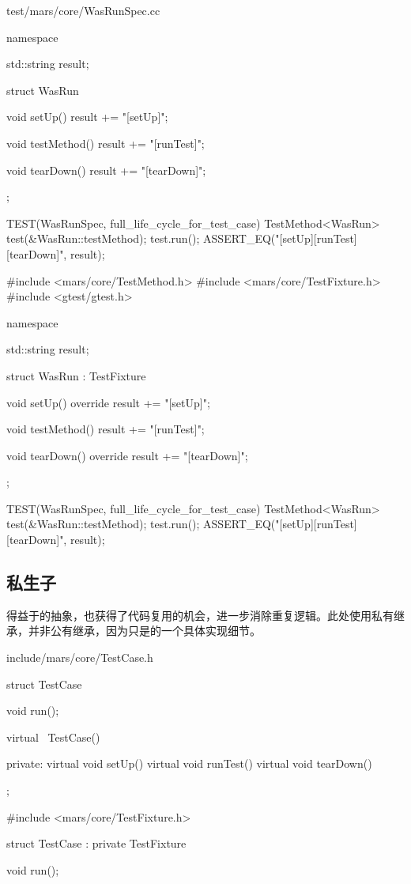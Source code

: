 \begin{content}
\begin{diff}{test/mars/core/WasRunSpec.cc}
\begin{minicpp}
namespace {
  std::string result;

  struct WasRun {
    void setUp() {
      result += "[setUp]";
    }

    void testMethod() {
      result += "[runTest]";
    }

    void tearDown() {
      result += "[tearDown]";
    }
  };
}

TEST(WasRunSpec, full_life_cycle_for_test_case) {
  TestMethod<WasRun> test(&WasRun::testMethod);
  test.run();
  ASSERT_EQ("[setUp][runTest][tearDown]", result);
}
\end{minicpp}
\tcblower
\begin{minicpp}
#include <mars/core/TestMethod.h>
#include <mars/core/TestFixture.h>
#include <gtest/gtest.h>

namespace {
  std::string result;

  struct WasRun : TestFixture {
    void setUp() override {
      result += "[setUp]";
    }

    void testMethod() {
      result += "[runTest]";
    }

    void tearDown() override {
      result += "[tearDown]";
    }
  };
}

TEST(WasRunSpec, full_life_cycle_for_test_case) {
  TestMethod<WasRun> test(&WasRun::testMethod);
  test.run();
  ASSERT_EQ("[setUp][runTest][tearDown]", result);
}
\end{minicpp}
\end{diff}

\subsection{私生子}

得益于的抽象，也获得了代码复用的机会，进一步消除重复逻辑。此处使用私有继承，并非公有继承，因为只是的一个具体实现细节。

\begin{diff}{include/mars/core/TestCase.h}
 \begin{minicpp}
struct TestCase {
  void run();

  virtual ~TestCase() {}

private:
  virtual void setUp() {}
  virtual void runTest() {}
  virtual void tearDown() {}
};
  \end{minicpp}
\tcblower
 \begin{minicpp}
#include <mars/core/TestFixture.h>

struct TestCase : private TestFixture {
  void run();

}
\end{minicpp}
\end{diff}
\end{content}
